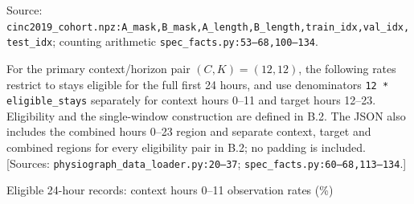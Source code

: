 Source: \texttt{cinc2019\_\allowbreak{}cohort.\allowbreak{}npz:\allowbreak{}A\_\allowbreak{}mask,\allowbreak{}B\_\allowbreak{}mask,\allowbreak{}A\_\allowbreak{}length,\allowbreak{}B\_\allowbreak{}length,\allowbreak{}train\_\allowbreak{}idx,\allowbreak{}val\_\allowbreak{}idx,\allowbreak{}test\_\allowbreak{}idx}; counting arithmetic \texttt{spec\_\allowbreak{}facts.\allowbreak{}py:\allowbreak{}53–\allowbreak{}68,\allowbreak{}100–\allowbreak{}134}.

For the primary context/horizon pair \((C,K)=(12,12)\), the following rates restrict to stays eligible for the full first 24 hours, and use denominators \texttt{12 * eligible\_\allowbreak{}stays} separately for context hours 0–11 and target hours 12–23. Eligibility and the single-window construction are defined in B.2. The JSON also includes the combined hours 0–23 region and separate context, target and combined regions for every eligibility pair in B.2; no padding is included. [Sources: \texttt{physiograph\_\allowbreak{}data\_\allowbreak{}loader.\allowbreak{}py:\allowbreak{}20–\allowbreak{}37}; \texttt{spec\_\allowbreak{}facts.\allowbreak{}py:\allowbreak{}60–\allowbreak{}68,\allowbreak{}113–\allowbreak{}134}.]

Eligible 24-hour records: context hours 0–11 observation rates (\%)

